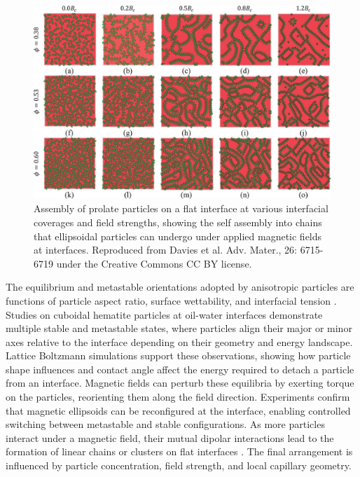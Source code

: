 \begin{figure}
    \centering
    \includegraphics[scale = 0.4]{figures/introduction/anisotropic_particles_assembly.jpg}
    \caption{Assembly of prolate particles on a flat interface at various interfacial coverages and field strengths,
             showing the self assembly into chains that ellipsoidal particles can undergo under applied magnetic fields at
             interfaces. \cite{davies_assembling_2014} Reproduced from Davies et al. Adv. Mater., 26: 6715-6719 under the 
             Creative Commons CC BY license.}
    \label{fig:anisotropic_assembly}
\end{figure}

The equilibrium and metastable orientations adopted by anisotropic particles are functions of particle aspect ratio, surface wettability, and interfacial tension 
\cite{morgan_understanding_2013, newton_influence_2014}. Studies on cuboidal hematite particles at oil-water interfaces demonstrate multiple stable and metastable states, where particles align 
their major or minor axes relative to the interface depending on their geometry and energy landscape. Lattice Boltzmann simulations support these observations, showing how particle shape influences 
and contact angle affect the energy required to detach a particle from an interface. \cite{davies_detachment_2014}
Magnetic fields can perturb these equilibria by exerting torque on the particles, reorienting them along the field direction. 
Experiments confirm that magnetic ellipsoids can be reconfigured at the interface, enabling controlled switching between metastable and stable configurations.
As more particles interact under a magnetic field, their mutual dipolar interactions lead to the formation of linear chains or clusters on flat interfaces \cite{davies_assembling_2014, newton_capillary_2018}. 
The final arrangement is influenced by particle concentration, field strength, and local capillary geometry. 

